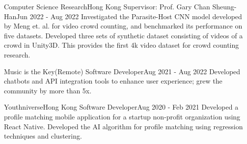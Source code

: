 \documentclass[letterpaper, 11pt]{article}
\begin{document}
        \resumeSubheading
            {Computer Science Research}{Hong Kong}
            {Supervisor: Prof. Gary Chan Sheung-Han}{Jun 2022 - Aug 2022}
            \resumeItemListStart
                    {Investigated the Parasite-Host CNN model developed by Meng et. al. for video crowd counting, and benchmarked its performance on five datasets.}
                    {Developed three sets of synthetic dataset consisting of videos of a crowd in Unity3D. This provides the first 4k video dataset for crowd counting research.}
            \resumeItemListEnd


        \resumeSubheading
            {Music is the Key}{(Remote)}
            {Software Developer}{Aug 2021 - Aug 2022}
            \resumeItemListStart
                    {Developed chatbots and API integration tools to enhance user experience; grew the community by more than 5x.}
            \resumeItemListEnd

        \resumeSubheading
            {Youthniverse}{Hong Kong}
            {Software Developer}{Aug 2020 - Feb 2021}
            \resumeItemListStart
                    {Developed a profile matching mobile application for a startup non-profit organization using React Native.}
                    {Developed the AI algorithm for profile matching using regression techniques and clustering.}
            \resumeItemListEnd
    \resumeSubHeadingListEnd


\end{document}

